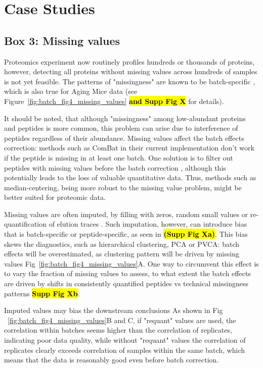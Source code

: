 \documentclass[num-refs]{wiley-article}
\begin{document}
\section{Case Studies}


\begin{tcolorbox}
	\section*{Box 3: Missing values}
	\label{box:Box3_missingness}
	Proteomics experiment now routinely profiles hundreds or thousands of proteins, however, detecting all proteins without missing values across hundreds of samples is not yet feasible. The patterns of "missingness" are known to be batch-specific \cite{Karpievitch2012}, which is also true for Aging Mice data (see Figure~\ref{fig:batch_fig4_missing_values} \textcolor{red}{\textbf{\hl{and Supp Fig X}}} for details).
	
	It should be noted, that although "missingness" among low-abundant proteins and peptides is more common, this problem can arise due to interference of peptides regardless of their abundance. 
Missing values affect the batch effects correction: methods such as ComBat \cite{Johnson:2007aa} in their current implementation don't work if the peptide is missing in at least one batch. One solution is to filter out peptides with missing values before the batch correction \cite{Lee:2019aa}, although this potentially leads to the loss of valuable quantitative data. Thus, methods such as median-centering, being more robust to the missing value problem, might be better suited for proteomic data.
	
	Missing values are often imputed, by filling with zeros, random small values \cite{Tyanova:2016aa} or re-quantification of elution traces \cite{Rost2016}. Such imputation, however, can introduce bias that is batch-specific or peptide-specific, as seen in  \textcolor{red}{\textbf{\hl{(Supp Fig Xa)}}}. This bias skews the diagnostics, such as hierarchical clustering, PCA or PVCA: batch effects will be overestimated, as clustering pattern will be driven by missing values Fig~\ref{fig:batch_fig4_missing_values}A. One way to circumvent this effect is to vary the fraction of missing values to assess, to what extent the batch effects are driven by shifts in consistently quantified peptides vs technical missingness patterns \textcolor{red}{\textbf{\hl{Supp Fig Xb}}}.
	
	Imputed values may bias the downstream conclusions As shown in Fig ~\ref{fig:batch_fig4_missing_values}B and C, if "requant" values are used, the correlation within batches seems higher than the correlation of replicates, indicating poor data quality, while without "requant" values the correlation of replicates clearly exceeds correlation of samples within the same batch, which means that the data is reasonably good even before batch correction. 
	

\end{tcolorbox}
\end{document}
